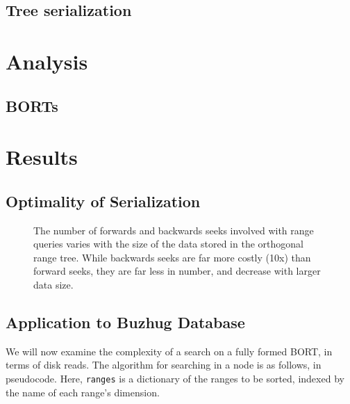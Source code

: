\documentclass[11pt, oneside]{article}
\begin{document}
\subsection{Tree serialization}

\section{Analysis}

\subsection{BORTs}

\section{Results}

\subsection{Optimality of Serialization}
\begin{figure}[b!]
\centering
{}%
\caption{The number of forwards and backwards seeks involved with range queries varies with the size of the data stored in the orthogonal range tree. While backwards seeks are far more costly (10x) than forward seeks, they are far less in number, and decrease with larger data size.}
\label{fig:figure2}
\end{figure}
\subsection{Application to Buzhug Database}
We will now examine the complexity of a search on a fully formed BORT, in terms
of disk reads. The algorithm for searching in a node is as follows, in
pseudocode. Here, \texttt{ranges} is a dictionary of the ranges to be sorted,
indexed by the name of each range's dimension.
\end{document}
